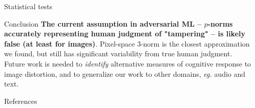 \documentclass[final,notheorems]{beamer}
\newlength{\sepwidth}
\newlength{\colwidth}
\newcommand{\separatorcolumn}{\begin{column}{\sepwidth}\end{column}}
\begin{document}
\begin{frame}[t]
\begin{columns}[t]
\begin{column}{\colwidth}
\begin{block}{Statistical tests}
  \end{block}

  \begin{alertblock}{Conclusion}
    \textbf{The current assumption in adversarial ML -- $p$-norms accurately representing human judgment of "tampering" -- is likely false (at least for images)}. Pixel-space $3$-norm is the closest approximation we found, but still has significant variability from true human judgment. Future work is needed to \emph{identify} alternative measures of cognitive response to image distortion, and to generalize our work to other domains, \textit{eg.} audio and text.
  \end{alertblock}

  \begin{block}{References}
    \footnotesize{\printbibliography}
  \end{block}

\end{column}

\separatorcolumn
\end{columns}
\end{frame}
\end{document}
